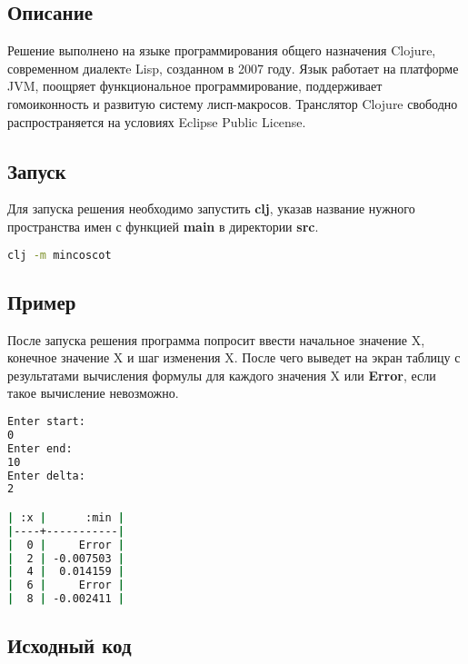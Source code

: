 \documentclass[a4paper,12pt,russian]{report}
\begin{document}
\subsection{Описание}
Решение выполнено на языке программирования общего назначения Clojure, современном диалектe Lisp, созданном в 2007 году. Язык работает на платформе JVM, поощряет функциональное программирование, поддерживает гомоиконность и развитую систему лисп-макросов. Транслятор Clojure свободно распространяется на условиях Eclipse Public License.

\subsection{Запуск}
Для запуска решения необходимо запустить \textbf{clj}, указав название нужного пространства имен с функцией \textbf{main} в директории \textbf{src}.
\begin{lstlisting}[language=bash]
clj -m mincoscot
\end{lstlisting}

\subsection{Пример}
После запуска решения программа попросит ввести начальное значение X, конечное значение X и шаг изменения X. После чего выведет на экран таблицу с результатами вычисления формулы для каждого значения X или \textbf{Error}, если такое вычисление невозможно.
\begin{lstlisting}[language=bash]
Enter start:
0
Enter end:
10
Enter delta:
2

| :x |      :min |
|----+-----------|
|  0 |     Error |
|  2 | -0.007503 |
|  4 |  0.014159 |
|  6 |     Error |
|  8 | -0.002411 |
\end{lstlisting}
\clearpage

\subsection{Исходный код}

\end{document}
